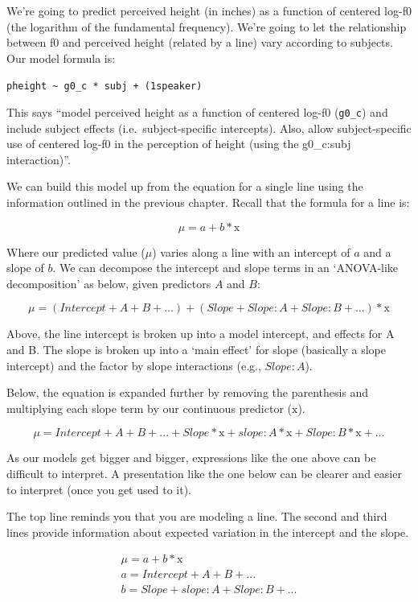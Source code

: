\documentclass[
]{book}
\begin{document}
We're going to predict perceived height (in inches) as a function of centered log-f0 (the logarithm of the fundamental frequency). We're going to let the relationship between f0 and perceived height (related by a line) vary according to subjects. Our model formula is:

\texttt{pheight\ \textasciitilde{}\ g0\_c\ *\ subj\ +\ (1\textbar{}speaker)}

This says ``model perceived height as a function of centered log-f0 (\texttt{g0\_c}) and include subject effects (i.e.~subject-specific intercepts). Also, allow subject-specific use of centered log-f0 in the perception of height (using the g0\_c:subj interaction)''.

We can build this model up from the equation for a single line using the information outlined in the previous chapter. Recall that the formula for a line is:

\[
\mu = a + b * \mathrm{x}
\label{eq:61}
\]

Where our predicted value (\(\mu\)) varies along a line with an intercept of \(a\) and a slope of \(b\). We can decompose the intercept and slope terms in an `ANOVA-like decomposition' as below, given predictors \(A\) and \(B\):

\[
\mu = (Intercept + A + B + ...) + (Slope + Slope \colon A + Slope \colon B + ...) * \mathrm{x}
\label{eq:62}
\]

Above, the line intercept is broken up into a model intercept, and effects for A and B. The slope is broken up into a `main effect' for slope (basically a slope intercept) and the factor by slope interactions (e.g., \(Slope \colon A\)).

Below, the equation is expanded further by removing the parenthesis and multiplying each slope term by our continuous predictor (\(\mathrm{x}\)).

\[
\mu = Intercept + A + B + ... + Slope* \mathrm{x} + slope \colon A* \mathrm{x} + Slope \colon B* \mathrm{x} + ...
\label{eq:63}
\]

As our models get bigger and bigger, expressions like the one above can be difficult to interpret. A presentation like the one below can be clearer and easier to interpret (once you get used to it).

The top line reminds you that you are modeling a line. The second and third lines provide information about expected variation in the intercept and the slope.

\begin{equation}
\begin{split}
\mu = a + b * \mathrm{x} \\
a = Intercept + A + B + ... \\
b = Slope + slope \colon A + Slope \colon B + ... \\
\end{split}
\label{eq:64}
\end{equation}
\end{document}
